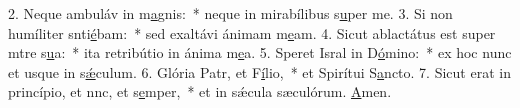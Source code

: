 2. Neque ambuláv in m\uline{a}gnis:~* neque in mirabílibus s\uline{u}per me.
3. Si non humíliter snti\uline{é}bam:~* sed exaltávi ánimam m\uline{e}am.
4. Sicut ablactátus est super mtre s\uline{u}a:~* ita retribútio in ánima m\uline{e}a.
5. Speret Isral in D\uline{ó}mino:~* ex hoc nunc et usque in s\uline{ǽ}culum.
6. Glória Patr, et F\uline{í}lio,~* et Spirítui S\uline{a}ncto.
7. Sicut erat in princípio, et nnc, et s\uline{e}mper,~* et in sǽcula sæculórum. \uline{A}men.
